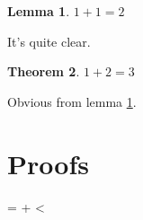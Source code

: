 \documentclass[a4paper]{article}
\makeatletter
\newcounter{proofcount}
\def\printproofs{%
			\count@=\z@
			\loop
				\the\toks\numexpr\prooftoks+\count@\relax
				\ifnum\count@<\value{proofcount}%
				\advance\count@\@ne
			\repeat%
		}
\newtheorem{thm}{Theorem}
\newtheorem{lem}[thm]{Lemma}
\makeatother
\begin{document}
\begin{lem}\label{addition}
	$1+1=2$
\end{lem}
\proofatend
	It's quite clear.
\endproofatend

\begin{thm}
	$1+2=3$
\end{thm}
\proofatend
	Obvious from lemma \ref{addition}.
\endproofatend

\section*{Proofs}

\printproofs
\end{document}
